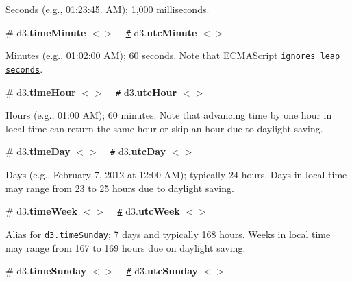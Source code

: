 Seconds (e.\+g., 01\+:23\+:45. AM); 1,000 milliseconds.

\label{_timeMinute}%
\# d3.{\bfseries time\+Minute} \href{https://github.com/d3/d3-time/blob/master/src/minute.js}{\tt $<$$>$} ~\newline
\href{#timeMinute}{\tt \#} d3.{\bfseries utc\+Minute} \href{https://github.com/d3/d3-time/blob/master/src/utcMinute.js}{\tt $<$$>$}

Minutes (e.\+g., 01\+:02\+:00 AM); 60 seconds. Note that E\+C\+M\+A\+Script \href{http://www.ecma-international.org/ecma-262/5.1/#sec-15.9.1.1}{\tt ignores leap seconds}.

\label{_timeHour}%
\# d3.{\bfseries time\+Hour} \href{https://github.com/d3/d3-time/blob/master/src/hour.js}{\tt $<$$>$} ~\newline
\href{#timeHour}{\tt \#} d3.{\bfseries utc\+Hour} \href{https://github.com/d3/d3-time/blob/master/src/utcHour.js}{\tt $<$$>$}

Hours (e.\+g., 01\+:00 AM); 60 minutes. Note that advancing time by one hour in local time can return the same hour or skip an hour due to daylight saving.

\label{_timeDay}%
\# d3.{\bfseries time\+Day} \href{https://github.com/d3/d3-time/blob/master/src/day.js}{\tt $<$$>$} ~\newline
\href{#timeDay}{\tt \#} d3.{\bfseries utc\+Day} \href{https://github.com/d3/d3-time/blob/master/src/utcDay.js}{\tt $<$$>$}

Days (e.\+g., February 7, 2012 at 12\+:00 AM); typically 24 hours. Days in local time may range from 23 to 25 hours due to daylight saving.

\label{_timeWeek}%
\# d3.{\bfseries time\+Week} \href{https://github.com/d3/d3-time/blob/master/src/week.js}{\tt $<$$>$} ~\newline
\href{#timeWeek}{\tt \#} d3.{\bfseries utc\+Week} \href{https://github.com/d3/d3-time/blob/master/src/utcWeek.js}{\tt $<$$>$}

Alias for \href{#timeSunday}{\tt d3.\+time\+Sunday}; 7 days and typically 168 hours. Weeks in local time may range from 167 to 169 hours due on daylight saving.

\label{_timeSunday}%
\# d3.{\bfseries time\+Sunday} \href{https://github.com/d3/d3-time/blob/master/src/week.js#L15}{\tt $<$$>$} ~\newline
\href{#timeSunday}{\tt \#} d3.{\bfseries utc\+Sunday} \href{https://github.com/d3/d3-time/blob/master/src/utcWeek.js#L15}{\tt $<$$>$}

